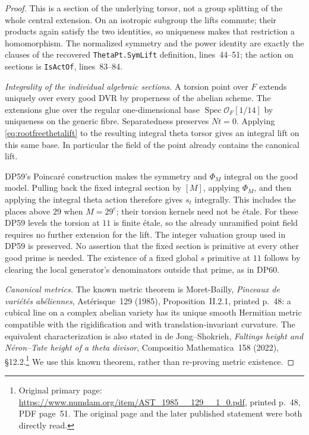 \begin{proof}
This is a section of the underlying torsor, not a group splitting of the whole central extension.
On an isotropic subgroup the lifts commute; their products again satisfy the two identities, so uniqueness makes that restriction a homomorphism.
The normalized symmetry and the power identity are exactly the clauses of the recovered \texttt{ThetaPt.SymLift} definition, lines~44--51; the action on sections is \texttt{IsActOf}, lines~83--84.

\emph{Integrality of the individual algebraic sections.}
A torsion point over $F$ extends uniquely over every good DVR by properness of the abelian scheme.
The extensions glue over the regular one-dimensional base $\operatorname{Spec}\mathcal O_F[1/14]$ by uniqueness on the generic fibre.
Separatedness preserves $Nt=0$.
Applying \eqref{eq:rootfreethetalift} to the resulting integral theta torsor gives an integral lift on this same base.
In particular the field of the point already contains the canonical lift.

DP59's Poincar\'e construction makes the symmetry and $\Phi_M$ integral on the good model.
Pulling back the fixed integral section by $[M]$, applying $\Phi_M$, and then applying the integral theta action therefore gives $s_t$ integrally.
This includes the places above $29$ when $M=29^e$; their torsion kernels need not be \'etale.
For these DP59 levels the torsion at $11$ is finite \'etale, so the already unramified point field requires no further extension for the lift.
The integer valuation group used in DP59 is preserved.
No assertion that the fixed section is primitive at every other good prime is needed.
The existence of a fixed global $s$ primitive at $11$ follows by clearing the local generator's denominators outside that prime, as in DP60.

\emph{Canonical metrics.}
The known metric theorem is Moret-Bailly, \emph{Pinceaux de vari\'et\'es ab\'eliennes}, Ast\'erisque~129 (1985), Proposition~II.2.1, printed p.~48: a cubical line on a complex abelian variety has its unique smooth Hermitian metric compatible with the rigidification and with translation-invariant curvature.
The equivalent characterization is also stated in de Jong--Shokrieh, \emph{Faltings height and N\'eron--Tate height of a theta divisor}, Compositio Mathematica~158 (2022), \S12.2.\footnote{Original primary page: \url{https://www.numdam.org/item/AST_1985__129__1_0.pdf}, printed p.~48, PDF page~51. The original page and the later published statement were both directly read.}
We use this known theorem, rather than re-proving metric existence.


\end{proof}
